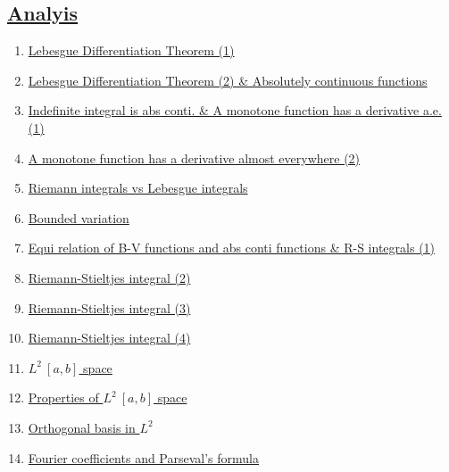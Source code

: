 \documentclass[11pt]{article}
\begin{document}
\subsection*{\href{https://www.youtube.com/playlist?list=PLVJXJebpO4PhfoJl9LEuiI30P1JxvLEga}{Analyis }}

\vspace{-0.25cm}

\begin{enumerate}
	\item	\href{https://mp.weixin.qq.com/s/OIaI3hbwGIUX3Y4e_EROOQ}{Lebesgue Differentiation Theorem (1)}	%
	\item	\href{https://mp.weixin.qq.com/s/drRat8Slew_KFj4Yq6x4JQ}{Lebesgue Differentiation Theorem (2) \& Absolutely continuous functions}	%
	\item	\href{https://mp.weixin.qq.com/s/9YEo-duMYyul3cUzaR-lrA}{Indefinite integral is abs conti. \& A monotone function has a derivative a.e. (1)} 	%
	\item 	\href{https://mp.weixin.qq.com/s/EjT8UKkCGNCbfiaZ1q8Y-w}{A monotone function has a derivative almost everywhere (2)}	%
	\item 	\href{https://mp.weixin.qq.com/s/9lX2gYoJxq8EKLONRnA4yA}{Riemann integrals vs Lebesgue integrals}	%
	\item 	\href{https://mp.weixin.qq.com/s/CMcL5vHqYH6aCJAXlEXDTg}{Bounded variation}	%
	\item 	\href{https://mp.weixin.qq.com/s/41Wz5ruEkfFlmV0KKtpamQ}{Equi relation of B-V functions and abs conti functions \& R-S integrals (1)}	%
	\item 	\href{https://mp.weixin.qq.com/s/Yf_pbXgA5ECfUt3Dr5QTcQ}{Riemann-Stieltjes integral (2)}	%
	\item 	\href{https://mp.weixin.qq.com/s/rqe5FeAjRmbjgZco_anx9g}{Riemann-Stieltjes integral (3)}	%
	\item 	\href{https://mp.weixin.qq.com/s/Qs7EPDpJZEbDnO5Urt_yig}{Riemann-Stieltjes integral (4)}	%
	\item	\href{https://mp.weixin.qq.com/s/loTF6azJc-z9owY5Bl_8RQ}{$L^2 \ [a,b]$ space}	%
	\item	\href{https://mp.weixin.qq.com/s/cs-zNCfw5_Y1NbCyS7wcMw}{Properties of $L^2 \ [a,b]$ space}	%
	\item	\href{https://mp.weixin.qq.com/s/GMPk8UOz4I_GiYxk8TAe7A}{Orthogonal basis in $L^2$} 	%
	\item 	\href{https://mp.weixin.qq.com/s/Zah3Ki2Psq0qEMq2QVGBmw}{Fourier coefficients and Parseval's formula}	%

\end{enumerate}
\end{document}
